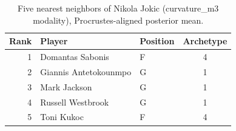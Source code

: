 \begin{table}[htbp]
  \centering\small
  \begin{tabular}{rllc}
    \toprule
    Rank & Player & Position & Archetype \\
    \midrule
    1 & Domantas Sabonis & F & 4 \\
    2 & Giannis Antetokounmpo & G & 1 \\
    3 & Mark Jackson & G & 1 \\
    4 & Russell Westbrook & G & 1 \\
    5 & Toni Kukoc & F & 4 \\
    \bottomrule
  \end{tabular}
  \caption{Five nearest neighbors of Nikola Jokic (curvature_m3 modality), Procrustes-aligned posterior mean.}
  \label{tab:Nikola_Jokic_neighbors_curvature_m3}
\end{table}

